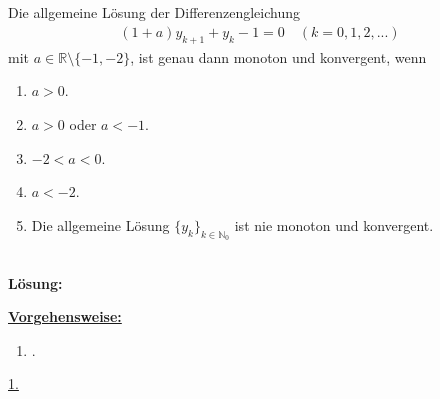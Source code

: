 \subsection*{}
Die allgemeine Lösung der  Differenzengleichung
\begin{align*}
	(1+a) y_{k+1} + y_k -1 = 0
	\quad (k = 0,1,2,...)
\end{align*}
mit $ a \in \mathbb{R} \setminus \{-1,-2\} $, ist genau dann monoton und konvergent, wenn
\renewcommand{\labelenumi}{(\alph{enumi})}
\begin{enumerate}
	\item
	$ a > 0 $.
	\item
	$ a >0 $ oder $ a < -1 $.	
	\item 
	$ -2 < a < 0 $.
	\item
	$ a < -2 $.
	\item 
	Die allgemeine Lösung $ \{y_k\}_{k \in \mathbb{N}_0} $ ist nie monoton und konvergent.
\end{enumerate}
\ \\
\textbf{Lösung:}
\begin{mdframed}
\underline{\textbf{Vorgehensweise:}}
\renewcommand{\labelenumi}{\theenumi.}
\begin{enumerate}
\item .
\end{enumerate}
\end{mdframed}

\underline{1. }\\
